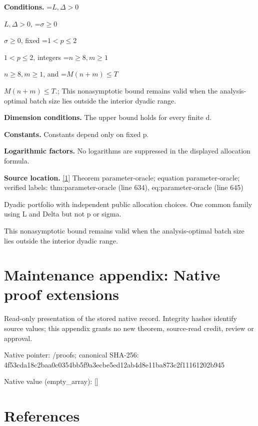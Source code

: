 \documentclass[10pt,a4paper]{article}
\newcommand{\AtlasMath}[1]{\par\begingroup\centering\setbox0=\hbox{$\displaystyle #1$}\ifdim\wd0>1.4\linewidth\typeout{ATLAS WIDE FORMULA: \the\wd0}\fi\ifdim\wd0>\linewidth\resizebox{\linewidth}{!}{\box0}\else\box0\fi\par\endgroup}
\newcommand{\AtlasInlineMath}[1]{\begingroup\setbox0=\hbox{$#1$}\ifdim\wd0>.4\linewidth\endgroup\AtlasMath{#1}\else\endgroup$#1$\fi}
\begin{document}
\textbf{Conditions.} \AtlasInlineMath{L,\Delta>0}, \AtlasInlineMath{\sigma\ge0}, fixed \AtlasInlineMath{1<p\le2}, integers \AtlasInlineMath{n\ge8,m\ge1}, and \AtlasInlineMath{M(n+m)\le T}.; This nonasymptotic bound remains valid when the analysis-optimal batch size lies outside the interior dyadic range.



\textbf{Dimension conditions.} The upper bound holds for every finite d.



\textbf{Constants.} Constants depend only on fixed p.



\textbf{Logarithmic factors.} No logarithms are suppressed in the displayed allocation formula.



\textbf{Source location.} \href{https://github.com/WU-Wendao/Colombo/blob/main/colombo_sensorium/Complexity_altas/data/sources/colombo/N05/manuscript.pdf}{[1]} Theorem parameter-oracle; equation parameter-oracle; verified labels: thm:parameter-oracle (line 634), eq:parameter-oracle (line 645)



Dyadic portfolio with independent public allocation choices. One common family using L and Delta but not p or sigma.



This nonasymptotic bound remains valid when the analysis-optimal batch size lies outside the interior dyadic range.



\section{Maintenance appendix: Native proof extensions}


Read-only presentation of the stored native record. Integrity hashes identify source values; this appendix grants no new theorem, source-read credit, review or approval.



Native pointer: /proofs; canonical SHA-256: 4f53cda18c2baa0c0354bb5f\allowbreak{}9a3ecbe5ed12ab4d8e11ba87\allowbreak{}3c2f11161202b945



Native value (empty\_array): []



\section{References}
\end{document}
